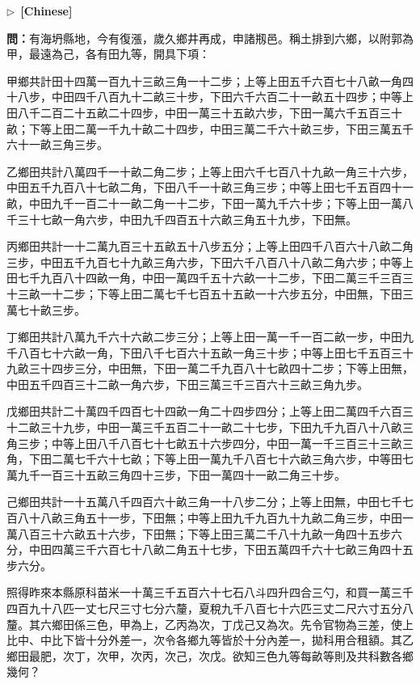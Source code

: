 \documentclass[10pt,a4paper]{article}
\newcommand{\CNmarker}{\noindent\textcolor{cnlabel}{$\triangleright$\ \textbf{[Chinese]}}\par}
\newcommand{\Question}[1]{\par\noindent\textbf{\color{problemcolor}問：}#1\par}
\begin{document}
\CNmarker
\Question{有海坍縣地，今有復漲，歲久鄉井再成，申諸剏邑。稱土排到六鄉，以附郭為甲，最遠為己，各有田九等，開具下項：

甲鄉共計田十四萬一百九十三畝三角一十二步；上等上田五千六百七十八畝一角四十八步，中田四千八百九十二畝三十步，下田六千六百二十一畝五十四步；中等上田八千二百二十五畝二十四步，中田一萬三十五畝六步，下田一萬六千五百三十畝；下等上田二萬一千九十畝二十四步，中田三萬二千六十畝三步，下田三萬五千六十一畝三角三步。

乙鄉田共計八萬四千一十畝二角二步；上等上田六千七百八十九畝一角三十六步，中田五千九百八十七畝二角，下田八千一十畝三角三步；中等上田七千五百四十一畝，中田九千一百二十一畝二角一十二步，下田一萬九千六十步；下等上田一萬八千三十七畝一角六步，中田九千四百五十六畝三角五十九步，下田無。

丙鄉田共計一十二萬九百三十五畝五十八步五分；上等上田四千八百六十八畝二角三步，中田五千九百七十九畝三角六步，下田六千八百八十八畝二角六步；中等上田七千九百八十四畝一角，中田一萬四千五十六畝一十二步，下田二萬三千三百三十三畝一十二步；下等上田二萬七千七百五十五畝一十六步五分，中田無，下田三萬七十畝三步。

丁鄉田共計八萬九千六十六畝二步三分；上等上田一萬一千一百二畝一步，中田九千八百七十六畝一角，下田八千七百六十五畝一角三十步；中等上田七千五百三十九畝三十四步三分，中田無，下田一萬二千九百八十七畝四十二步；下等上田無，中田五千四百三十二畝一角六步，下田三萬三千三百六十三畝三角九步。

戊鄉田共計二十萬四千四百七十四畝一角二十四步四分；上等上田二萬四千六百三十二畝三十九步，中田一萬三千五百二十一畝二十七步，下田九千九百八十八畝三角三步；中等上田八千八百七十七畝五十六步四分，中田一萬一千三百三十三畝三角，下田二萬七千六十七畝；下等上田一萬九千八百七十六畝三角六步，中等田七萬九千一百三十五畝三角四十三步，下田一萬四十一畝二角三十步。

己鄉田共計一十五萬八千四百六十畝三角一十八步二分；上等上田無，中田七千七百八十八畝三角五十一步，下田無；中等上田九千九百九十九畝二角三步，中田一萬八百三十六畝五十六步，下田無；下等上田三萬二千八十九畝一角四十五步六分，中田四萬三千六百七十八畝二角五十七步，下田五萬四千六十七畝三角四十五步六分。

照得昨來本縣原科苗米一十萬三千五百六十七石八斗四升四合三勺，和買一萬三千四百九十八匹一丈七尺三寸七分六釐，夏稅九千八百七十六匹三丈二尺六寸五分八釐。其六鄉田係三色，甲為上，乙丙為次，丁戊己又為次。先令官物為三差，使上比中、中比下皆十分外差一，次令各鄉九等皆於十分內差一，拋科用合租額。其乙鄉田最肥，次丁，次甲，次丙，次己，次戊。欲知三色九等每畝等則及共科數各鄉幾何？}
\end{document}
